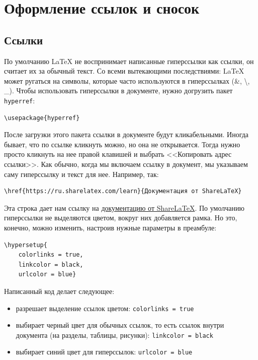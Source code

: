 \documentclass[12pt]{article}
\begin{document}
\section{Оформление ссылок и сносок}

\subsection{Ссылки}

По умолчанию \LaTeX{} не воспринимает написанные гиперссылки как ссылки, он считает их за обычный текст. Со всеми вытекающими последствиями: \LaTeX{} может ругаться на символы, которые часто используются в гиперссылках (\&, \textbackslash, \_). Чтобы использовать гиперссылки в документе, нужно догрузить пакет \texttt{hyperref}:

\begin{center}
\begin{BVerbatim}
\usepackage{hyperref}
\end{BVerbatim} 
\end{center}

После загрузки этого пакета ссылки в документе будут кликабельными. Иногда бывает, что по ссылке кликнуть можно, но она не открывается. Тогда нужно просто кликнуть на нее правой клавишей и выбрать <<Копировать адрес ссылки>>. Как обычно, когда мы включаем ссылку в документ, мы указываем саму гиперссылку и текст для нее. Например, так:

\begin{center}
\begin{BVerbatim}
\href{https://ru.sharelatex.com/learn}{Документация от ShareLaTeX}
\end{BVerbatim} 
\end{center}

Эта строка дает нам ссылку на \href{https://ru.sharelatex.com/learn}{документацию от ShareLaTeX}. По умолчанию гиперссылки не выделяются цветом, вокруг них добавляется рамка. Но это, конечно, можно изменить, настроив нужные параметры в преамбуле:

\begin{center}
\begin{BVerbatim}
\hypersetup{
	colorlinks = true,
	linkcolor = black,
   	urlcolor = blue}
\end{BVerbatim} 
\end{center}   	
   	
Написанный код делает следующее: 

\begin{itemize}

\item разрешает выделение ссылок цветом: \texttt{colorlinks = true}
\item выбирает черный цвет для обычных ссылок, то есть ссылок внутри документа (на разделы, таблицы, рисунки): \texttt{linkcolor = black}
\item выбирает синий цвет для гиперссылок: \texttt{urlcolor = blue}

\end{itemize}
   	
\end{document}
